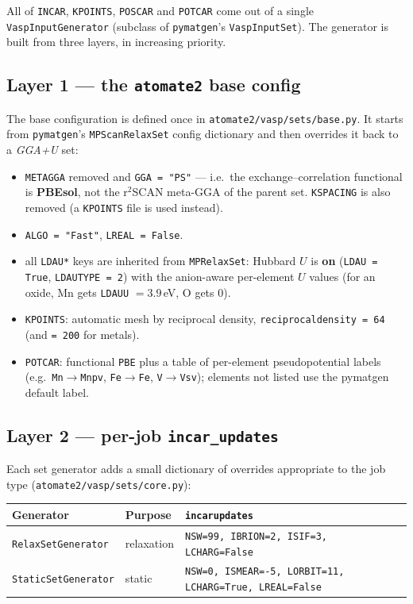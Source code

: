 \documentclass[11pt]{article}
\newcommand{\code}[1]{\texttt{\def\_{\textunderscore\allowbreak}#1}}
\begin{document}
All of \code{INCAR}, \code{KPOINTS}, \code{POSCAR} and \code{POTCAR} come out of a
single \code{VaspInputGenerator} (subclass of \code{pymatgen}'s
\code{VaspInputSet}). The generator is built from three layers, in increasing
priority.

\subsection{Layer 1 --- the \texttt{atomate2} base config}

The base configuration is defined once in \code{atomate2/vasp/sets/base.py}. It
starts from \code{pymatgen}'s \code{MPScanRelaxSet} config dictionary and then
overrides it back to a \emph{GGA{+}U} set:

\begin{itemize}
  \item \code{METAGGA} removed and \code{GGA = "PS"} --- i.e.\ the
        exchange--correlation functional is \textbf{PBEsol}, not the r$^2$SCAN
        meta-GGA of the parent set. \code{KSPACING} is also removed (a
        \code{KPOINTS} file is used instead).
  \item \code{ALGO = "Fast"}, \code{LREAL = False}.
  \item all \code{LDAU*} keys are inherited from \code{MPRelaxSet}: Hubbard $U$ is
        \textbf{on} (\code{LDAU = True}, \code{LDAUTYPE = 2}) with the
        anion-aware per-element $U$ values (for an oxide, Mn gets
        \code{LDAUU} $= 3.9$\,eV, O gets $0$).
  \item \code{KPOINTS}: automatic mesh by reciprocal density,
        \code{reciprocal\_density = 64} (and \code{= 200} for metals).
  \item \code{POTCAR}: functional \code{PBE\_54} plus a table of per-element
        pseudopotential labels (e.g.\ \code{Mn}$\to$\code{Mn\_pv},
        \code{Fe}$\to$\code{Fe}, \code{V}$\to$\code{V\_sv}); elements not listed
        use the pymatgen default label.
\end{itemize}

\subsection{Layer 2 --- per-job \texttt{incar\_updates}}

Each set generator adds a small dictionary of overrides appropriate to the job
type (\code{atomate2/vasp/sets/core.py}):

\begin{center}
\begin{tabular}{lll}
\toprule
Generator & Purpose & \code{incar\_updates} \\
\midrule
\code{RelaxSetGenerator}  & relaxation & \code{NSW=99, IBRION=2, ISIF=3, LCHARG=False} \\
\code{StaticSetGenerator} & static     & \code{NSW=0, ISMEAR=-5, LORBIT=11, LCHARG=True, LREAL=False} \\
\bottomrule
\end{tabular}
\end{center}
\end{document}
